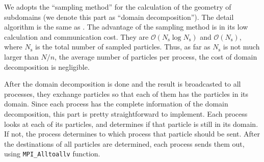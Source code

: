 We adopts the ``sampling
method'' \cite{Blackston:1997:HPE:509593.509597} for the calculation
of the geometry of subdomains (we denote this part as ``domain
decomposition''). The detail algorithm is the same
as \cite{ishiyama:greem}. The advantage of the sampling method is in
its low calculation and communication cost. They are
$\mathcal{O}(N_\mathrm{s} \log N_\mathrm{s})$ and
$\mathcal{O}(N_\mathrm{s} )$, where $N_\mathrm{s}$ is the total number
of sampled particles. Thus, as far as $N_\mathrm{s}$ is not much
larger than $N/n$, the average number of particles per process, the
cost of domain decomposition is negligible.

After the domain decomposition is done and the result is broadcasted
to all processes, they exchange particles so that each of them has the
particles in its domain. Since each process has the complete
information of the domain decomposition, this part is pretty
straightforward to implement. Each process looks at each of its
particles, and determines if that particle is still in its domain.  If
not, the process determines to which process that particle should be
sent. After the destinations of all particles are determined, each
process sends them out, using \texttt{MPI\_Alltoallv} function.

